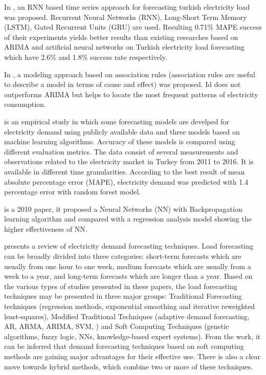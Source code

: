In \cite{8404313}, an RNN based time series approach for forecasting turkish electricity load was proposed.
Recurrent Neural Networks (RNN), Long-Short Term Memory (LSTM), Gated Recurrent Units (GRU) are used.
Resulting 0.71\% MAPE success of their experiments yields better results than existing researches based on ARIMA and artificial neural networks on Turkish electricity load forecasting which have 2.6\% and 1.8\% success rate respectively.

In \cite{9046493}, a modeling approach based on association rules (association rules are useful to describe a model in terms of cause and effect) was proposed.
Id does not outperforms ARIMA but helps to locate the most frequent patterns of electricity consumption.

\cite{8093428} is an empirical study in which some forecasting models are develped for electricity demand using publicly available data and three models based on machine learning algorithms.
Accuracy of these models is compared using different evaluation metrics.
The data consist of several measurements and observations related to the electricity market in Turkey from 2011 to 2016.
It is available in different time granularities.
According to the best result of mean absolute percentage error (MAPE), electricity demand was predicted with 1.4 percentage error with random forest model. 

\cite{5686767} is  a 2010 paper, it proposed a Neural Networks (NN) with Backpropagation learning algorithm and compared with a regression analysis model showing the higher effectiveness of NN.

\cite{singh2013overview} presents a review of electricity demand forecasting techniques.
Load forecasting can be broadly divided into three categories:
short-term forecasts which are usually from one hour to one week,
medium forecasts which are usually from a week to a year,
and long-term forecasts which are longer than a year.
Based on the various types of studies presented in these papers, the load forecasting techniques may be presented in three major groups: Traditional Forecasting techniques (regression methods, exponential smoothing and iterative reweighted least-squares), Modified Traditional Techniques (adaptive demand forecasting, AR, ARMA, ARIMA, SVM, ) and Soft Computing Techniques (genetic algorithms, fuzzy logic, NNs, knowledge-based expert systems).
From the work, it can be inferred that demand forecasting techniques based on soft computing methods are gaining major advantages for their effective use.
There is also a clear move towards hybrid methods, which combine two or more of these techniques.

